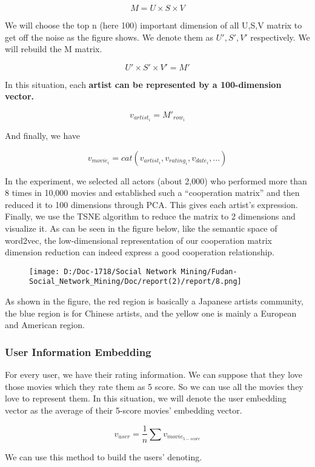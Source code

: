 \documentclass[]{article}
\begin{document}
\[M = U\times S\times V\]

We will choose the top n (here 100) important dimension of all U,S,V
matrix to get off the noise as the figure shows. We denote them as
\(U',S',V'\) respectively. We will rebuild the M matrix.

\[U'\times S'\times V' = M'\]

In this situation, each \textbf{artist can be represented by a
100-dimension vector.}

\[v_{artist_{i}} = M'_{row_{i}}\]

And finally, we have

\[v_{movie_i} = cat(v_{artist_i},v_{rating_i}, v_{date_i},...)\]

In the experiment, we selected all actors (about 2,000) who performed
more than 8 times in 10,000 movies and established such a ``cooperation
matrix'' and then reduced it to 100 dimensions through PCA. This gives
each artist's expression. Finally, we use the TSNE algorithm to reduce
the matrix to 2 dimensions and visualize it. As can be seen in the
figure below, like the semantic space of word2vec, the low-dimensional
representation of our cooperation matrix dimension reduction can indeed
express a good cooperation relationship.

\begin{figure}
\centering
\texttt{[image: D:/Doc-1718/Social Network Mining/Fudan-Social\_Network\_Mining/Doc/report(2)/report/8.png]}
\caption{}
\end{figure}

As shown in the figure, the red region is basically a Japanese artists
community, the blue region is for Chinese artists, and the yellow one is
mainly a European and American region.

\hypertarget{header-n152}{%
\subsubsection{User Information Embedding}\label{header-n152}}

For every user, we have their rating information. We can suppose that
they love those movies which they rate them as 5 score. So we can use
all the movies they love to represent them. In this situation, we will
denote the user embedding vector as the average of their 5-score movies'
embedding vector.

\[v_{user} = \dfrac{1}{n}\sum v_{movie_{5-score}}\]

We can use this method to build the users' denoting.
\end{document}
